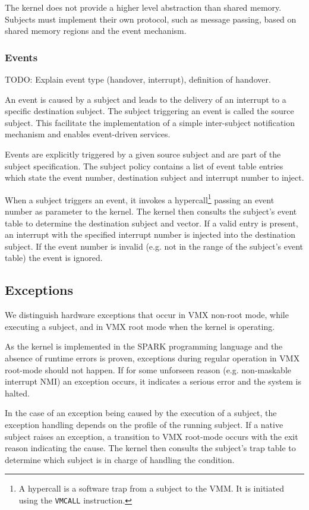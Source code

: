 The kernel does not provide a higher level abstraction than shared memory.
Subjects must implement their own protocol, such as message passing, based on
shared memory regions and the event mechanism.

\subsubsection{Events}
TODO: Explain event type (handover, interrupt), definition of handover.

An event is caused by a subject and leads to the delivery of an interrupt to a
specific destination subject. The subject triggering an event is called the
source subject. This facilitate the implementation of a simple inter-subject
notification mechanism and enables event-driven services.

Events are explicitly triggered by a given source subject and are part of the
subject specification. The subject policy contains a list of event table
entries which state the event number, destination subject and interrupt number
to inject.

When a subject triggers an event, it invokes a hypercall\footnote{A hypercall is
a software trap from a subject to the VMM. It is initiated using the
\texttt{VMCALL} instruction.} passing an event number as parameter to the
kernel. The kernel then consults the subject's event table to determine the
destination subject and vector. If a valid entry is present, an interrupt with
the specified interrupt number is injected into the destination subject. If the
event number is invalid (e.g. not in the range of the subject's event table) the
event is ignored.

\subsection{Exceptions}\label{subsec:design-exceptions}
We distinguish hardware exceptions that occur in VMX non-root mode, while
executing a subject, and in VMX root mode when the kernel is operating.

As the kernel is implemented in the SPARK programming language and the absence
of runtime errors is proven, exceptions during regular operation in VMX
root-mode should not happen. If for some unforseen reason (e.g. non-maskable
interrupt NMI) an exception occurs, it indicates a serious error and the system
is halted.

In the case of an exception being caused by the execution of a subject, the
exception handling depends on the profile of the running subject. If a native
subject raises an exception, a transition to VMX root-mode occurs with the exit
reason indicating the cause. The kernel then consults the subject's trap table
to determine which subject is in charge of handling the condition.

